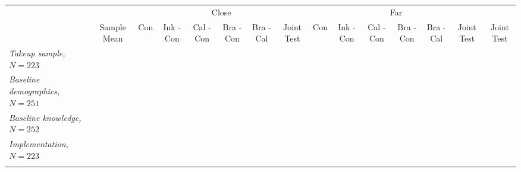 \centering
\begin{tabular}{l c c c c c c c c c c c c c c}
\hline\hline
 & & \multicolumn{6}{c}{Close} & \multicolumn{6}{c}{Far} & \\
\cmidrule(lr){3-8} \cmidrule(lr){9-14}
 & Sample Mean & Con & Ink - Con & Cal - Con & Bra - Con & Bra - Cal & Joint Test & Con & Ink - Con & Cal - Con & Bra - Con & Bra - Cal & Joint Test & Joint Test \\
\hline
\textit{Takeup sample,} $N = 223$ \\
\addlinespace
\addlinespace
\textit{Baseline demographics,} $N = 251$ \\
\addlinespace
\addlinespace
\textit{Baseline knowledge,} $N = 252$ \\
\addlinespace
\addlinespace
\textit{Implementation,} $N = 223$ \\
\addlinespace
\addlinespace
\hline\hline
\end{tabular}
